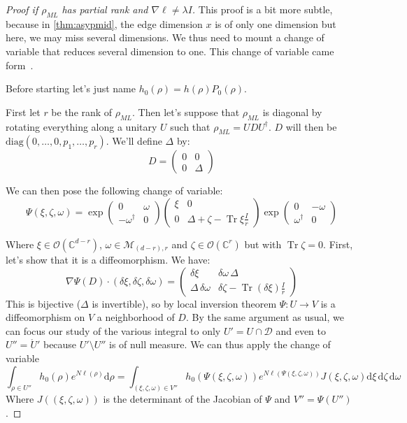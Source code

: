 \documentclass[10pt,a4paper]{report}
\theoremstyle{plain}
\theoremstyle{definition}
\theoremstyle{remark}
\newcommand{\C}{\ensuremath{\mathbb{C}}}
\newcommand{\dd}{\mathrm{d}}
\newcommand{\mat}[1]{\begin{pmatrix}#1\end{pmatrix}}
\DeclareMathOperator{\Tr}{Tr}
\newcommand{\ml}{_{M\!L}}
\begin{document}
\begin{proof}[Proof if $\rho\ml$ has partial rank and $\nabla \ell \neq \lambda I$]
  This proof is a bit more subtle, because in \cref{thm:asypmid}, the edge
  dimension $x$ is of only one dimension but here, we may miss several
  dimensions. We thus need to mount a change of variable that reduces several
  dimension to one. This change of variable came form~\cite{SPRAL17}.

  Before starting let's just name $h_0(\rho) = h(\rho)P_0(\rho)$.

  First let $r$ be the rank of $\rho\ml$. Then let's suppose that $\rho\ml$ is
  diagonal by rotating everything along a unitary $U$ such that $\rho\ml = U
  DU^\dagger$. $D$ will then be $\mathrm{diag}(0,\ldots,0,p_1,\ldots,p_r)$.
  We'll define $\Delta$ by:
  \[ D = \mat{0 & 0\\0&\Delta}\]

  We can then
  pose the following change of variable:
  \begin{equation}
  \Psi(\xi,\zeta,\omega) = \exp\mat{0 &\omega\\-\omega^\dagger&0}
    \mat{\xi&0\\0&\Delta + \zeta - \Tr \xi \frac{I}r} \exp\mat{0 &-\omega\\\omega^\dagger&0}
  \end{equation}

  Where $\xi \in \mathcal{O}(\C^{d-r})$, $\omega \in \mathcal{M}_{(d-r),r}$ and
  $\zeta \in \mathcal{O}(\C^r)$ but with $\Tr \zeta = 0$. First, let's show that
  it is a diffeomorphism. We have:
  \begin{equation}
    \nabla \Psi(D) \cdot (\delta\xi,\delta\zeta, \delta\omega) =
    \mat{\delta\xi& \delta\omega\,\Delta\\ \Delta\, \delta\omega & \delta\zeta -
      \Tr(\delta\xi)\frac Ir}
  \end{equation}
  This is bijective ($\Delta$ is invertible), so by local inversion theorem
  $\Psi : U \to V$ is a diffeomorphism on $V$ a neighborhood of $D$. By the
  same argument as usual, we can focus our study of the various integral to only
  $U' = U \cap \mathcal{D}$ and even to $U'' = \mathring U'$ because $U'
  \setminus U''$ is of null measure. We can thus apply the change of variable
  \newcommand{\vars}{(\xi,\zeta,\omega)}
  \newcommand{\dvars}{\dd \xi\, \dd \zeta\, \dd \omega\,}
  \newcommand{\pvars}{\Psi(\xi,\zeta,\omega)}
  \begin{equation}\label{eqn:uglyint}
    \int_{\rho \in U''} h_0(\rho)e^{N\ell(\rho)}\dd \rho =
    \int_{\vars \in V''} h_0(\pvars)e^{N\ell(\pvars)}J\vars \dvars
  \end{equation}
  Where $J(\vars)$ is the determinant of the Jacobian of $\Psi$ and $V'' = \Psi(U'')$.


\end{proof}
\end{document}
